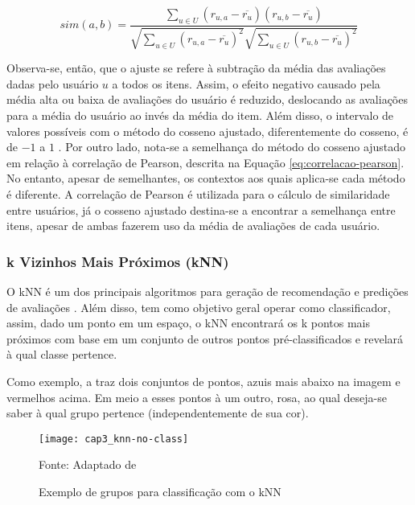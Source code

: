         \begin{equation}
             sim(a, b) = \frac{\sum_{u\in U}(r_{u, a}-\overline{r_u})(r_{u, b}-\overline{r_u})}{\sqrt{\sum_{u\in U}(r_{u, a}-\overline{r_u})^2}\sqrt{\sum_{u\in U}(r_{u, b}-\overline{r_u})^2}} \label{eq:sim-cosseno-ajustado}
        \end{equation}
        
        Observa-se, então, que o ajuste se refere à subtração da média das avaliações dadas pelo usuário $u$ a todos os itens. Assim, o efeito negativo causado pela média alta ou baixa de avaliações do usuário é reduzido, deslocando as avaliações para a média do usuário ao invés da média do item. Além disso, o intervalo de valores possíveis com o método do cosseno ajustado, diferentemente do cosseno, é de $-1$ a $1$ \cite{Jannach2010, Ricci2010}. Por outro lado, nota-se a semelhança do método do cosseno ajustado em relação à correlação de Pearson, descrita na Equação \ref{eq:correlacao-pearson}. No entanto, apesar de semelhantes, os contextos aos quais aplica-se cada método é diferente. A correlação de Pearson é utilizada para o cálculo de similaridade entre usuários, já o cosseno ajustado destina-se a encontrar a semelhança entre itens, apesar de ambas fazerem uso da média de avaliações de cada usuário.
        
        \subsubsection{k Vizinhos Mais Próximos (kNN)}
            
            O kNN é um dos principais algoritmos para geração de recomendação e predições de avaliações \cite{Bobadilla_2013}. Além disso, tem como objetivo geral operar como classificador, assim, dado um ponto em um espaço, o kNN encontrará os k pontos mais próximos com base em um conjunto de outros pontos pré-classificados e revelará à qual classe pertence. 
            
            Como exemplo, a  traz dois conjuntos de pontos, azuis mais abaixo na imagem e vermelhos acima. Em meio a esses pontos à um outro, rosa, ao qual deseja-se saber à qual grupo pertence (independentemente de sua cor).             
            
            \begin{figure}[htb]
                \caption{Exemplo de grupos para classificação com o kNN}
                \texttt{[image: cap3\_knn-no-class]}
                \label{fig:cap3_knn-no-class}
                
                {\footnotesize Fonte: Adaptado de }
            \end{figure}
                        
